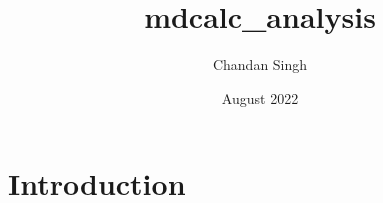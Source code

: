 \documentclass{article}
\title{mdcalc_analysis}
\author{Chandan Singh}
\date{August 2022}
\begin{document}
\maketitle

\section{Introduction}
\end{document}
